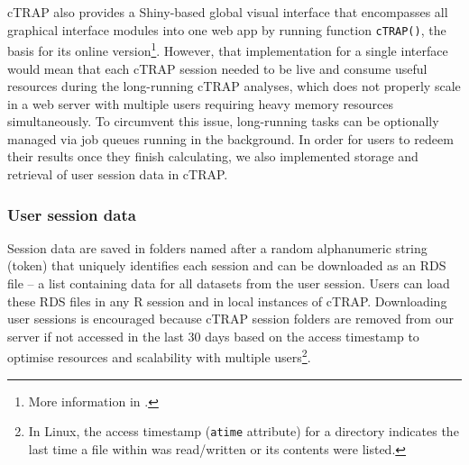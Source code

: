 cTRAP also provides a Shiny-based global visual interface that encompasses all graphical interface modules into one web app by running function \texttt{cTRAP()}, the basis for its online version\footnote{More information in .}. However, that implementation for a single interface would mean that each cTRAP session needed to be live and consume useful resources during the long-running cTRAP analyses, which does not properly scale in a web server with multiple users requiring heavy memory resources simultaneously. To circumvent this issue, long-running tasks can be optionally managed via job queues running in the background. In order for users to redeem their results once they finish calculating, we also implemented storage and retrieval of user session data in cTRAP.

\subsubsection{User session data}
\label{sec:ctrap-web}

Session data are saved in folders named after a random alphanumeric string (token) that uniquely identifies each session and can be downloaded as an RDS file -- a list containing data for all datasets from the user session. Users can load these RDS files in any R session and in local instances of cTRAP. Downloading user sessions is encouraged because cTRAP session folders are removed from our server if not accessed in the last 30 days based on the access timestamp to optimise resources and scalability with multiple users\footnote{In Linux, the access timestamp (\texttt{atime} attribute) for a directory indicates the last time a file within was read/written or its contents were listed.}.

